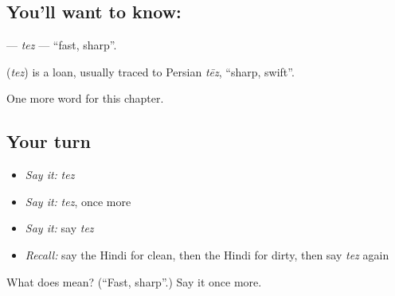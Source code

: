 \subsection*{You'll want to know: }
\textbf{} — \emph{tez} — \textquotedblleft{}fast, sharp\textquotedblright{}.

\begin{cousinweb}
\textbf{} (\emph{tez}) is a loan, usually traced to Persian \emph{tēz}, \textquotedblleft{}sharp, swift\textquotedblright{}.
\end{cousinweb}

\begin{grammarlens}[title={What you've built}]
One more word for this chapter.
\end{grammarlens}

\subsection*{Your turn}
\begin{itemize}
\raggedright
  \item \emph{Say it:} \emph{tez}
  \item \emph{Say it:} \emph{tez}, once more
  \item \emph{Say it:} say \emph{tez}
  \item \emph{Recall:} say the Hindi for clean, then the Hindi for dirty, then say \emph{tez} again
\end{itemize}

\begin{tcolorbox}[breakable,colback=teal!4,colframe=teal!35!black,title={Before you move on}]
What does  mean? (\textquotedblleft{}Fast, sharp\textquotedblright{}.) Say it once more.
\end{tcolorbox}

